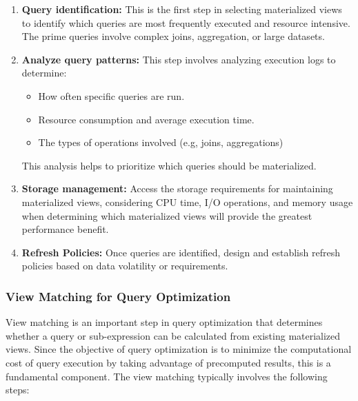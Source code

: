 \begin{enumerate}[label=\alph*)]
    \item \textbf{Query identification:} This is the first step in selecting materialized views to identify which queries are most frequently executed and resource intensive. The prime queries involve complex joins, aggregation, or large datasets.
    
    \item \textbf{Analyze query patterns:} This step involves analyzing execution logs to determine:
    
     \begin{itemize}
          \item How often specific queries are run.
          \item Resource consumption and average execution time.
          \item The types of operations involved (e.g, joins, aggregations)
      \end{itemize}
      This analysis helps to prioritize which queries should be materialized.
      
    \item \textbf{Storage management:} Access the storage requirements for maintaining materialized views, considering CPU time, I/O operations, and memory usage when determining which materialized views will provide the greatest performance benefit.
    
    \item \textbf{Refresh Policies:} Once queries are identified, design and establish refresh policies based on data volatility or requirements.
\end{enumerate}
\subsubsection{View Matching for Query Optimization }

View matching is an important step in query optimization that determines whether a query or sub-expression can be calculated from existing materialized views. Since the objective of query optimization is to minimize the computational cost of query execution by taking advantage of precomputed results, this is a fundamental component. The view matching typically involves the following steps:\vspace{.4cm}

